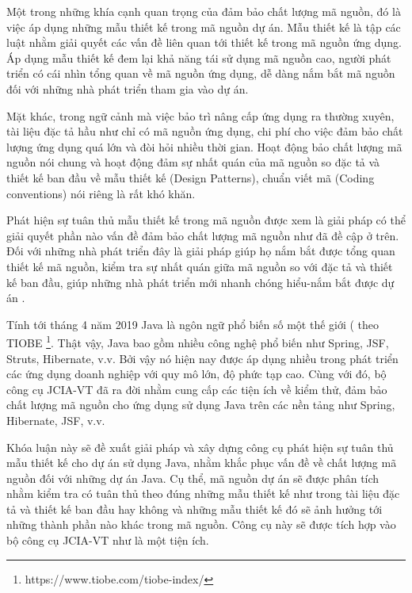\documentclass[12pt]{report}
\begin{document}
\noindent Một trong những khía cạnh quan trọng của đảm bảo chất lượng mã nguồn, đó là việc áp dụng những mẫu thiết kế trong mã nguồn dự án. Mẫu thiết kế là tập các luật nhằm giải quyết các vấn đề liên quan tới thiết kế trong mã nguồn ứng dụng. Áp dụng mẫu thiết kế đem lại khả năng tái sử dụng mã nguồn cao, người phát triển có cái nhìn tổng quan về mã nguồn ứng dụng, dễ dàng nắm bắt mã nguồn đối với những nhà phát triển tham gia vào dự án.

\noindent Mặt khác, trong ngữ cảnh mà việc bảo trì nâng cấp ứng dụng ra thường xuyên, tài liệu đặc tả hầu như chỉ có mã nguồn ứng dụng, chi phí cho việc đảm bảo chất lượng ứng dụng quá lớn và đòi hỏi nhiều thời gian. Hoạt động bảo chất lượng mã nguồn nói chung và hoạt động đảm sự nhất quán của mã nguồn so đặc tả và thiết kế ban đầu về mẫu thiết kế \cite{go4} (Design Patterns), chuẩn viết mã (Coding conventions) nói riêng là rất khó khăn.

\noindent Phát hiện sự tuân thủ mẫu thiết kế trong mã nguồn được xem là giải pháp có thể giải quyết phần nào vấn đề đảm bảo chất lượng mã nguồn như đã đề cập ở trên. Đối với những nhà phát triển đây là giải pháp giúp họ nắm bắt được tổng quan thiết kế mã nguồn, kiểm tra sự nhất quán giữa mã nguồn so với đặc tả và thiết kế ban đầu, giúp những nhà phát triển mới nhanh chóng hiểu-nắm bắt được dự án \cite{orucc2016}.

\noindent Tính tới tháng 4 năm 2019 Java là ngôn ngữ phổ biến số một thế giới ( theo TIOBE \footnote{https://www.tiobe.com/tiobe-index/}. Thật vậy, Java bao gồm nhiều công nghệ phổ biến như Spring, JSF, Struts, Hibernate, v.v. Bởi vậy nó hiện nay được áp dụng nhiều trong phát triển các ứng dụng doanh nghiệp với quy mô lớn, độ phức tạp cao. Cùng với đó, bộ công cụ JCIA-VT đã ra đời nhằm cung cấp các tiện ích về kiểm thử, đảm bảo chất lượng mã nguồn cho ứng dụng sử dụng Java trên các nền tảng như Spring, Hibernate, JSF, v.v.

\noindent Khóa luận này sẽ đề xuất giải pháp và xây dựng công cụ phát hiện sự tuân thủ mẫu thiết kế cho dự án sử dụng Java, nhằm khắc phục vấn đề về chất lượng mã nguồn đối với những dự án Java. Cụ thể, mã nguồn dự án sẽ được phân tích nhằm kiểm tra có tuân thủ theo đúng những mẫu thiết kế như trong tài liệu đặc tả và thiết kế ban đầu hay không và những mẫu thiết kế đó sẽ ảnh hưởng tới những thành phần nào khác trong mã nguồn. Công cụ này sẽ được tích hợp vào bộ công cụ JCIA-VT như là một tiện ích.
\end{document}

